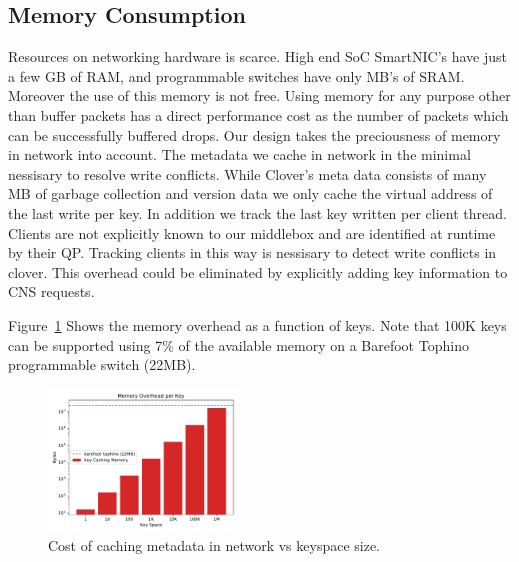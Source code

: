 \subsection{Memory Consumption}

Resources on networking hardware is scarce. High end SoC SmartNIC's
have just a few GB of RAM, and programmable switches have only MB's of
SRAM. Moreover the use of this memory is not free. Using memory for
any purpose other than buffer packets has a direct performance cost as
the number of packets which can be successfully buffered drops. Our
design takes the preciousness of memory in network into account. The
metadata we cache in network in the minimal nessisary to resolve write
conflicts. While Clover's meta data consists of many MB of garbage
collection and version data we only cache the virtual address of the
last write per key. In addition we track the last key written per
client thread. Clients are not explicitly known to our middlebox and
are identified at runtime by their QP. Tracking clients in this way is
nessisary to detect write conflicts in clover. This overhead could be
eliminated by explicitly adding key information to CNS requests.

Figure~\ref{fig:memory} Shows the memory overhead as a function of
keys. Note that 100K keys can be supported using 7\% of the available
memory on a Barefoot Tophino programmable switch (22MB).

\begin{figure}
    \includegraphics[width=0.45\textwidth]{fig/memory.pdf}
    \caption{Cost of caching metadata in network vs keyspace size.}
    \label{fig:memory}
\end{figure}









